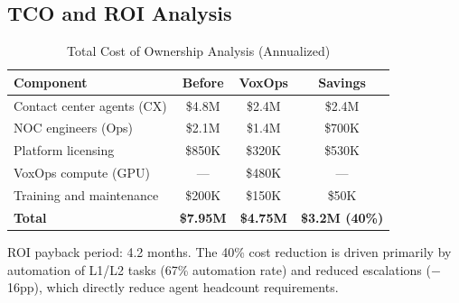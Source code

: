 \documentclass[conference,10pt]{IEEEtran}
\begin{document}
\begin{table}[!htbp]
\caption{VoxOps vs.\ Industry Voice AI Platforms}
\label{tab:compete}
\centering\scriptsize
{}
\end{table}

\subsection{TCO and ROI Analysis}

\begin{table}[!htbp]
\caption{Total Cost of Ownership Analysis (Annualized)}
\label{tab:tco}
\centering\scriptsize
\begin{tabular}{@{}lccc@{}}
\toprule
\textbf{Component} & \textbf{Before} & \textbf{VoxOps} & \textbf{Savings} \\
\midrule
Contact center agents (CX) & \$4.8M & \$2.4M & \$2.4M \\
NOC engineers (Ops) & \$2.1M & \$1.4M & \$700K \\
Platform licensing & \$850K & \$320K & \$530K \\
VoxOps compute (GPU) & --- & \$480K & --- \\
Training and maintenance & \$200K & \$150K & \$50K \\
\midrule
\textbf{Total} & \textbf{\$7.95M} & \textbf{\$4.75M} & \textbf{\$3.2M (40\%)} \\
\bottomrule
\end{tabular}
\end{table}

ROI payback period: 4.2 months. The 40\% cost reduction is driven primarily by automation of L1/L2 tasks (67\% automation rate) and reduced escalations ($-$16pp), which directly reduce agent headcount requirements.
\end{document}
